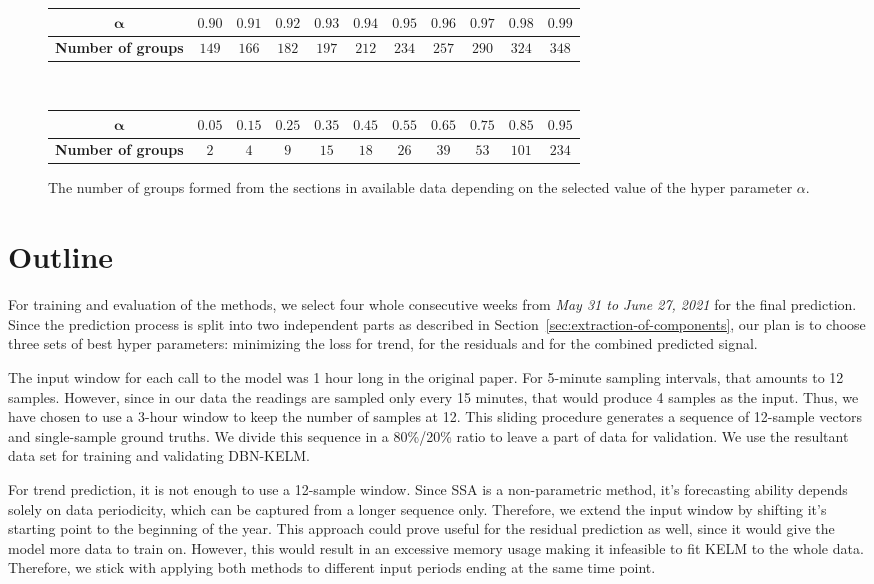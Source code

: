 \begin{figure}
\begin{minipage}{\textwidth}
\begin{tabular}{c|c|c|c|c|c|c|c|c|c|c}
			$\mathbf{\alpha}$ & $0.90$ & $0.91$ & $0.92$ & $0.93$ & $0.94$ &
			$0.95$ & $0.96$ & $0.97$ & $0.98$ & $0.99$ \\
			\hline
			\textbf{Number of groups} & $149$ & $166$ & $182$ & $197$ & $212$ &
			$234$ & $257$ & $290$ & $324$ & $348$
		\end{tabular}\\
		\begin{tabular}{c|c|c|c|c|c|c|c|c|c|c}
			$\mathbf{\alpha}$ & $0.05$ & $0.15$ & $0.25$ & $0.35$ & $0.45$ &
			$0.55$ & $0.65$ & $0.75$ & $0.85$ & $0.95$ \\
			\hline
			\textbf{Number of groups} & $2$ & $4$ & $9$ & $15$ & $18$ & $26$ &
			$39$ & $53$ & $101$ & $234$
		\end{tabular}
	\end{minipage}
	\caption{The number of groups formed from the sections in available data depending on the selected value of the hyper parameter $\alpha$.}
	\label{fig:alpha-groups}
\end{figure}


\section{Outline}

For training and evaluation of the methods, we select four whole consecutive
weeks from \textit{May 31 to June 27, 2021} for the final prediction. Since the
prediction process is split into two independent parts as described in
Section~\ref{sec:extraction-of-components}, our plan is to choose three  sets of
best hyper parameters: minimizing the loss for trend, for the residuals
and for the combined predicted signal.

The input window for each call to the model was 1 hour long in the original
paper. For 5-minute sampling intervals, that amounts to 12 samples. However,
since in our data the readings are sampled only every 15 minutes, that would
produce 4 samples as the input. Thus, we have chosen to use a 3-hour window to
keep the number of samples at 12. This sliding procedure generates a sequence of
12-sample vectors and single-sample ground truths. We divide this sequence in a
80\%/20\% ratio to leave a part of data for validation. We use the resultant
data set for training and validating DBN-KELM.

For trend prediction, it is not enough to use a 12-sample window. Since SSA is a
non-parametric method, it's forecasting ability depends solely on data
periodicity, which can be captured from a longer sequence only. Therefore, we
extend the input window by shifting it's starting point to the beginning of the
year. This approach could prove useful for the residual prediction as well,
since it would give the model more data to train on. However, this would
result in an excessive memory usage making it infeasible to fit KELM to the
whole data. Therefore, we stick with applying both methods to different input
periods ending at the same time point.

